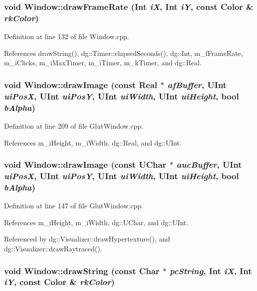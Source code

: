 \subsubsection{\setlength{\rightskip}{0pt plus 5cm}void Window::draw\-Frame\-Rate ({\bf Int} {\em i\-X}, {\bf Int} {\em i\-Y}, const {\bf Color} \& {\em rk\-Color})}\label{classdg_1_1Window_a21}




Definition at line 132 of file Window.cpp.

References draw\-String(), dg::Timer::elapsed\-Seconds(), dg::Int, m\_\-f\-Frame\-Rate, m\_\-i\-Clicks, m\_\-i\-Max\-Timer, m\_\-i\-Timer, m\_\-k\-Timer, and dg::Real.
\subsubsection{\setlength{\rightskip}{0pt plus 5cm}void Window::draw\-Image (const {\bf Real} $\ast$ {\em af\-Buffer}, {\bf UInt} {\em ui\-Pos\-X}, {\bf UInt} {\em ui\-Pos\-Y}, {\bf UInt} {\em ui\-Width}, {\bf UInt} {\em ui\-Height}, bool {\em b\-Alpha})}\label{classdg_1_1Window_a19}




Definition at line 209 of file Glut\-Window.cpp.

References m\_\-i\-Height, m\_\-i\-Width, dg::Real, and dg::UInt.
\subsubsection{\setlength{\rightskip}{0pt plus 5cm}void Window::draw\-Image (const {\bf UChar} $\ast$ {\em auc\-Buffer}, {\bf UInt} {\em ui\-Pos\-X}, {\bf UInt} {\em ui\-Pos\-Y}, {\bf UInt} {\em ui\-Width}, {\bf UInt} {\em ui\-Height}, bool {\em b\-Alpha})}\label{classdg_1_1Window_a18}




Definition at line 147 of file Glut\-Window.cpp.

References m\_\-i\-Height, m\_\-i\-Width, dg::UChar, and dg::UInt.

Referenced by dg::Visualizer::draw\-Hypertexture(), and dg::Visualizer::draw\-Raytraced().
\subsubsection{\setlength{\rightskip}{0pt plus 5cm}void Window::draw\-String (const {\bf Char} $\ast$ {\em pc\-String}, {\bf Int} {\em i\-X}, {\bf Int} {\em i\-Y}, const {\bf Color} \& {\em rk\-Color})}\label{classdg_1_1Window_a20}




